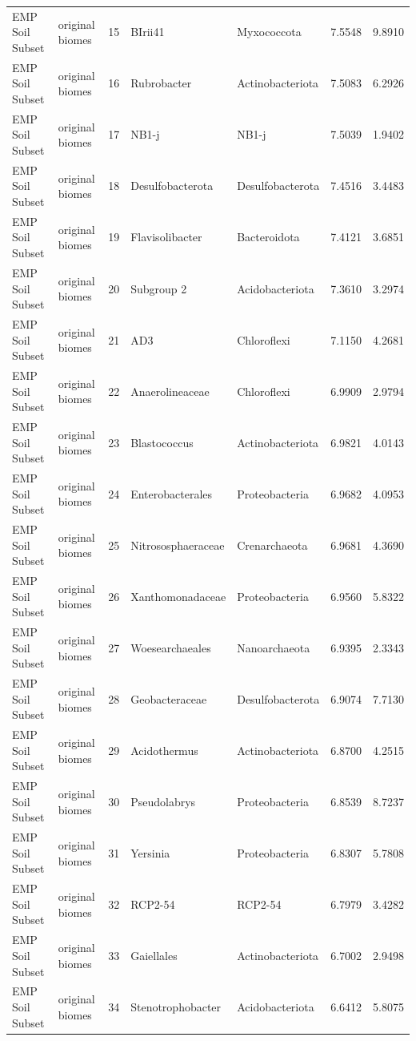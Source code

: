 \documentclass[12pt, oneside]{report}
\begin{document}
\begin{center}
\begin{longtable}{llrp{2.7cm}p{2.2cm}rr}
EMP Soil Subset & original biomes & 15 & BIrii41 & Myxococcota & 7.5548 & 9.8910 \\
EMP Soil Subset & original biomes & 16 & Rubrobacter & Actinobacteriota & 7.5083 & 6.2926 \\
EMP Soil Subset & original biomes & 17 & NB1-j & NB1-j & 7.5039 & 1.9402 \\
EMP Soil Subset & original biomes & 18 & Desulfobacterota & Desulfobacterota & 7.4516 & 3.4483 \\
EMP Soil Subset & original biomes & 19 & Flavisolibacter & Bacteroidota & 7.4121 & 3.6851 \\
EMP Soil Subset & original biomes & 20 & Subgroup 2 & Acidobacteriota & 7.3610 & 3.2974 \\
EMP Soil Subset & original biomes & 21 & AD3 & Chloroflexi & 7.1150 & 4.2681 \\
EMP Soil Subset & original biomes & 22 & Anaerolineaceae & Chloroflexi & 6.9909 & 2.9794 \\
EMP Soil Subset & original biomes & 23 & Blastococcus & Actinobacteriota & 6.9821 & 4.0143 \\
EMP Soil Subset & original biomes & 24 & Enterobacterales & Proteobacteria & 6.9682 & 4.0953 \\
EMP Soil Subset & original biomes & 25 & Nitrososphaeraceae & Crenarchaeota & 6.9681 & 4.3690 \\
EMP Soil Subset & original biomes & 26 & Xanthomonadaceae & Proteobacteria & 6.9560 & 5.8322 \\
EMP Soil Subset & original biomes & 27 & Woesearchaeales & Nanoarchaeota & 6.9395 & 2.3343 \\
EMP Soil Subset & original biomes & 28 & Geobacteraceae & Desulfobacterota & 6.9074 & 7.7130 \\
EMP Soil Subset & original biomes & 29 & Acidothermus & Actinobacteriota & 6.8700 & 4.2515 \\
EMP Soil Subset & original biomes & 30 & Pseudolabrys & Proteobacteria & 6.8539 & 8.7237 \\
EMP Soil Subset & original biomes & 31 & Yersinia & Proteobacteria & 6.8307 & 5.7808 \\
EMP Soil Subset & original biomes & 32 & RCP2-54 & RCP2-54 & 6.7979 & 3.4282 \\
EMP Soil Subset & original biomes & 33 & Gaiellales & Actinobacteriota & 6.7002 & 2.9498 \\
EMP Soil Subset & original biomes & 34 & Stenotrophobacter & Acidobacteriota & 6.6412 & 5.8075 \\

\end{longtable}
\end{center}
\end{document}
